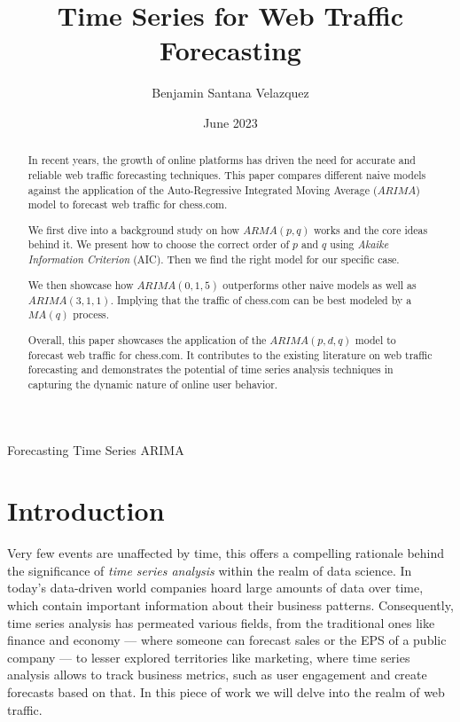 \documentclass[journal]{IEEEtran}
\title{Time Series for Web Traffic Forecasting}
\author{Benjamin Santana Velazquez}
\date{June 2023}
\begin{document}
\maketitle

\begin{abstract}
    In recent years, the growth of online platforms has driven the need for
    accurate and reliable web traffic forecasting techniques. This paper
    compares different naive models against the application of the
    Auto-Regressive Integrated Moving Average ($ARIMA$) model to forecast web
    traffic for chess.com.

    We first dive into a background study on how $ARMA(p,q)$ works and the core
    ideas behind it. We present how to choose the correct order of $p$ and $q$
    using \emph{Akaike Information Criterion} (AIC). Then we find the right
    model for our specific case.

    We then showcase how $ARIMA(0,1,5)$ outperforms other naive models as well
    as $ARIMA(3,1,1)$. Implying that the traffic of chess.com can be best
    modeled by a $MA(q)$ process.

    Overall, this paper showcases the application of the $ARIMA(p,d,q)$ model
    to forecast web traffic for chess.com. It contributes to the existing
    literature on web traffic forecasting and demonstrates the potential of
    time series analysis techniques in capturing the dynamic nature of online
    user behavior.
\end{abstract}

\begin{IEEEkeywords}
    Forecasting
    Time Series
    ARIMA
\end{IEEEkeywords}

\section{Introduction}\label{sec:intro}
Very few events are unaffected by time, this offers a compelling rationale
behind the significance of \emph{time series analysis} within the
realm of data science. In today's data-driven world companies hoard large
amounts of data over time, which contain important information about their
business patterns. Consequently, time series analysis has permeated various
fields, from the traditional ones like finance and economy --- where someone
can forecast sales or the EPS of a public company --- to lesser explored
territories like marketing, where time series analysis allows to track business
metrics, such as user engagement and create forecasts based on that. In this
piece of work we will delve into the realm of web traffic.
\end{document}
